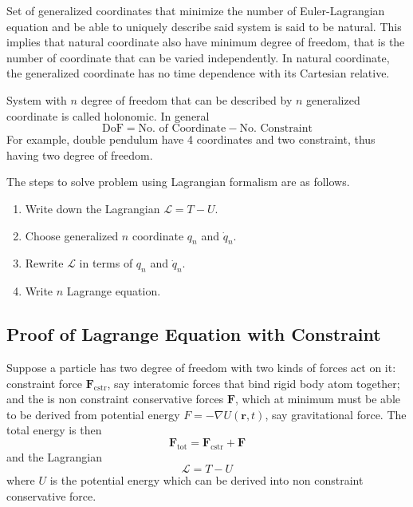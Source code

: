 \documentclass[../../../main.tex]{subfiles}
\begin{document}
Set of generalized coordinates that minimize the number of Euler-Lagrangian equation and be able to uniquely describe said system is said to be natural.
This implies that natural coordinate also have minimum degree of freedom, that is the number of coordinate that can be varied independently.
In natural coordinate, the generalized coordinate has no time dependence with its Cartesian relative. 

System with $n$ degree of freedom that can be described by $n$ generalized coordinate is called holonomic.
In general
\begin{equation*}
	\text{DoF}=\text{No. of Coordinate}-\text{No. Constraint}
\end{equation*}
For example, double pendulum have 4 coordinates and two constraint, thus having two degree of freedom.

The steps to solve problem using Lagrangian formalism are as follows.
\begin{enumerate}
	\item Write down the Lagrangian $\mathcal{L}=T-U$.
	\item Choose generalized $n$ coordinate $q_n$ and $\dot{q}_n$.
	\item Rewrite $\mathcal{L}$ in terms of $q_n$ and $\dot{q}_n$.
	\item Write $n$ Lagrange equation.
\end{enumerate}

\subsection*{Proof of Lagrange Equation with Constraint}
Suppose a particle has two degree of freedom with two kinds of forces act on it:
constraint force $\mathbf{F}_\text{cstr}$, say interatomic forces that bind rigid body atom together;
and the is non constraint conservative forces $\mathbf{F}$, which at minimum must be able to be derived from potential energy $F=-\nabla U(\mathbf{r},t)$, say gravitational force.
The total energy is then
\begin{equation*}
	\mathbf{F}_\text{tot}=\mathbf{F}_\text{cstr}+\mathbf{F}
\end{equation*}
and the Lagrangian
\begin{equation*}
	\mathcal{L}=T-U
\end{equation*}
where $U$ is the potential energy which can be derived into non constraint conservative force.
\end{document}
